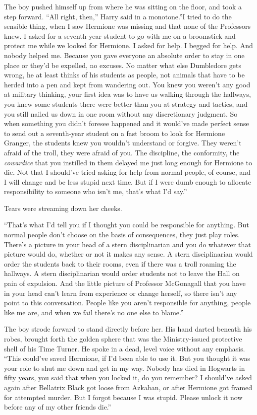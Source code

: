 The boy pushed himself up from where he was sitting on the floor, and
took a step forward. ``All right, then,'' Harry said in a monotone.''I
tried to do the sensible thing, when I saw Hermione was missing and that
none of the Professors knew. I asked for a seventh-year student to go
with me on a broomstick and protect me while we looked for Hermione. I
asked for help. I begged for help. And nobody helped me. Because you
gave everyone an absolute order to stay in one place or they'd be
expelled, no excuses. No matter what else Dumbledore gets wrong, he at
least thinks of his students as people, not animals that have to be
herded into a pen and kept from wandering out. You knew you weren't any
good at military thinking, your first idea was to have us walking
through the hallways, you knew some students there were better than you
at strategy and tactics, and you still nailed us down in one room
without any discretionary judgment. So when something you didn't foresee
happened and it would've made perfect sense to send out a seventh-year
student on a fast broom to look for Hermione Granger, the students knew
you wouldn't understand or forgive. They weren't afraid of the troll,
they were afraid of you. The discipline, the conformity, the
\emph{cowardice} that you instilled in them delayed me just long enough
for Hermione to die. Not that I should've tried asking for help from
normal people, of course, and I will change and be less stupid next
time. But if I were dumb enough to allocate responsibility to someone
who isn't me, that's what I'd say.''

Tears were streaming down her cheeks.

``That's what I'd tell you if I thought you could be responsible for
anything. But normal people don't choose on the basis of consequences,
they just play roles. There's a picture in your head of a stern
disciplinarian and you do whatever that picture would do, whether or not
it makes any sense. A stern disciplinarian would order the students back
to their rooms, even if there was a troll roaming the hallways. A stern
disciplinarian would order students not to leave the Hall on pain of
expulsion. And the little picture of Professor McGonagall that you have
in your head can't learn from experience or change herself, so there
isn't any point to this conversation. People like you aren't responsible
for anything, people like me are, and when we fail there's no one else
to blame.''

The boy strode forward to stand directly before her. His hand darted
beneath his robes, brought forth the golden sphere that was the
Ministry-issued protective shell of his Time Turner. He spoke in a dead,
level voice without any emphasis. ``This could've saved Hermione, if I'd
been able to use it. But you thought it was your role to shut me down
and get in my way. Nobody has died in Hogwarts in fifty years, you said
that when you locked it, do you remember? I should've asked again after
Bellatrix Black got loose from Azkaban, or after Hermione got framed for
attempted murder. But I forgot because I was stupid. Please unlock it
now before any of my other friends die.''

